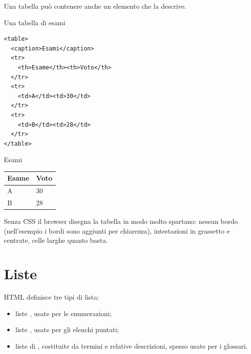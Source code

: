 Una tabella può contenere anche un elemento  che la descrive.

\begin{esempio}{Una tabella di esami}
\begin{affianco}[0.5]
\begin{lstlisting}[style=html, name=tabella.html]
<table>
  <caption>Esami</caption>
  <tr>
    <th>Esame</th><th>Voto</th>
  </tr>
  <tr>
    <td>A</td><td>30</td>
  </tr>
  <tr>
    <td>B</td><td>28</td>
  </tr>
</table>
\end{lstlisting}
\risultato
\begin{browser}
  \begin{center}
    {\Lora Esami}\\[3pt]
    {\Lora
    \begin{tabular}{|l|l|}
      \hline
      \textbf{Esame} & \textbf{Voto} \\ \hline
      A & 30 \\ \hline
      B & 28 \\ \hline
    \end{tabular}}
  \end{center}
\end{browser}
\end{affianco}

Senza CSS il browser disegna la tabella in modo molto spartano: nessun bordo
(nell'esempio i bordi sono aggiunti per chiarezza), intestazioni in grassetto e
centrate, celle larghe quanto basta.
\end{esempio}


\section{Liste}

HTML definisce tre tipi di lista:

\begin{itemize}
  \item liste  , usate per le enumerazioni;
  \item liste  , usate per gli elenchi puntati;
  \item liste di  , costituite da termini e relative
        descrizioni, spesso usate per i glossari.
\end{itemize}

